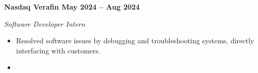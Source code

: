\vspace{0.1cm}
\textbf{Nasdaq Verafin \hfill May 2024 -- Aug 2024} \par
\textit{Software Developer Intern} \par
\begin{itemize}
	\item Resolved software issues by debugging and troubleshooting systems, directly interfacing with customers.
  \item
\end{itemize} \par